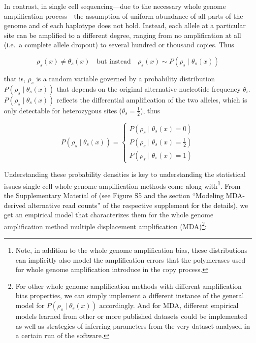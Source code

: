 \documentclass[authoryear,preprint,11pt]{scrartcl}
\newcommand{\Prob}{{P}}
\begin{document}
In contrast, in single cell sequencing---due to the necessary whole genome amplification process---the assumption of uniform abundance of all parts of the genome and of each haplotype does not hold.
Instead, each allele at a particular site can be amplified to a different degree, ranging from no amplification at all (i.e.~a complete allele dropout) to several hundred or thousand copies.
Thus

\begin{equation}
 \label{eq.nonUniDependency}
 \rho_s(x) \ne \theta_s(x)\quad\text{but instead}\quad \rho_s(x) \sim \Prob(\rho_s \mid \theta_s(x))
\end{equation}

that is, $\rho_s$ is a random variable governed by a probability distribution ${\Prob(\rho_s \mid \theta_s(x) )}$ that depends on the original alternative nucleotide frequency $\theta_s$.
$\Prob(\rho_s \mid \theta_s(x))$ reflects the differential amplification of the two alleles, which is only detectable for heterozygous sites ($\theta_s = \frac12$), thus

\begin{equation}
 \label{eq.rho-given-theta}
 \Prob(\rho_s \mid \theta_s(x) ) =
 \begin{cases}
  \Prob(\rho_s \mid \theta_s(x) = 0)        \\
  \Prob(\rho_s \mid \theta_s(x) = \frac12 ) \\
  \Prob(\rho_s \mid \theta_s(x) = 1 )
 \end{cases}
\end{equation}

Understanding these probability densities is key to understanding the statistical issues single cell whole genome amplification methods come along with\footnote{
 Note, in addition to the whole genome amplification bias, these distributions can implicitly also model the amplification errors that the polymerases used for whole genome amplification introduce in the copy process.
}.
From the Supplementary Material of \cite{lodato_somatic_2015} (see Figure S5 and the section ``Modeling MDA-derived alternative read counts'' of the respective supplement for the details), we get an empirical model that characterizes them for the whole genome amplification method multiple displacement amplification (MDA)\footnote{
 For other whole genome amplification methods with different amplification bias properties, we can simply implement a different instance of the general model for $\Prob(\rho_s \mid \theta_s(x))$ accordingly.
 And for MDA, different empirical models learned from other or more published datasets could be implemented as well as strategies of inferring parameters from the very dataset analysed in a certain run of the software.
}:
\end{document}
